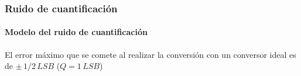 \documentclass{beamer}
\begin{document}
\begin{frame}
\frametitle{Ruido de cuantificación}
\framesubtitle{Modelo del ruido de cuantificación}
{
\begin{block}{}
El error máximo que se comete al realizar la conversión con un conversor ideal
es de $\pm\,1/2\,LSB$ ($Q = 1\,LSB$)
		\end{block}
}
\begin{center}
\end{center}
\end{frame} 

%
\end{document}
